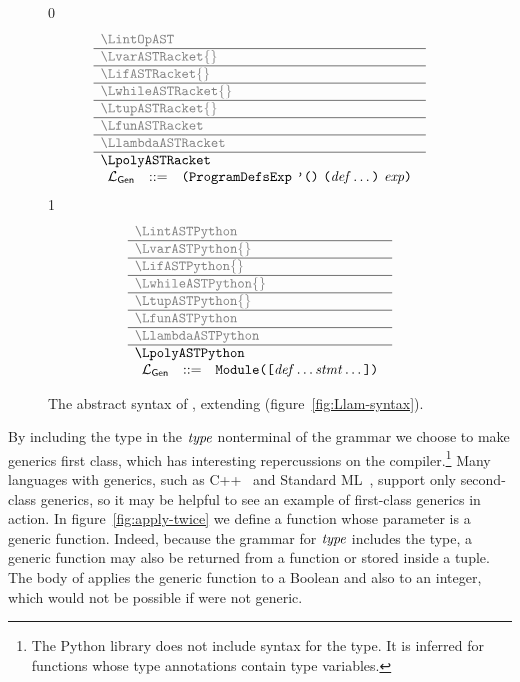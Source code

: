\documentclass[7x10]{TimesAPriori_MIT}%
\newcommand{\gray}[1]{{\color{gray} #1}}
\def\racketEd{0}
\def\pythonEd{1}
\def\edition{1}
\newcommand{\pythonColor}[0]{}
\numberwithin{theorem}{chapter}
\numberwithin{definition}{chapter}
\numberwithin{equation}{chapter}
\begin{document}
\begin{figure}[tp]
\centering
\begin{tcolorbox}[colback=white]
\footnotesize
{\if\edition\racketEd
\[
\begin{array}{l}
  \gray{\LintOpAST} \\ \hline
  \gray{\LvarASTRacket{}} \\ \hline
  \gray{\LifASTRacket{}} \\ \hline
  \gray{\LwhileASTRacket{}} \\ \hline
  \gray{\LtupASTRacket{}} \\ \hline
  \gray{\LfunASTRacket} \\ \hline
  \gray{\LlambdaASTRacket} \\ \hline
  \LpolyASTRacket \\
\begin{array}{lcl}
  \LangPoly{} &::=& \PROGRAMDEFSEXP{\code{'()}}{\LP\Def\ldots\RP}{\Exp}
\end{array}
\end{array}
\]
\fi}
{\if\edition\pythonEd\pythonColor
\[
\begin{array}{l}
  \gray{\LintASTPython} \\ \hline
  \gray{\LvarASTPython{}} \\ \hline
  \gray{\LifASTPython{}} \\ \hline
  \gray{\LwhileASTPython{}} \\ \hline
  \gray{\LtupASTPython{}} \\ \hline
  \gray{\LfunASTPython} \\ \hline
  \gray{\LlambdaASTPython} \\ \hline
  \LpolyASTPython \\
  \begin{array}{lcl}
  \LangPoly{} &::=& \PROGRAM{}{\LS \Def \ldots \Stmt \ldots \RS}
  \end{array}
\end{array}
\]
\fi}
\end{tcolorbox}

\caption{The abstract syntax of \LangPoly{}, extending \LangLam{}
    (figure~\ref{fig:Llam-syntax}).}
\label{fig:Lpoly-syntax}
\end{figure}

By including the  type in the $\mathit{type}$ nonterminal of the
grammar we choose to make generics first class, which has interesting
repercussions on the compiler.\footnote{The Python  library does
not include syntax for the  type. It is inferred for functions whose
type annotations contain type variables.}  Many languages with generics, such as
C++~\citep{stroustrup88:_param_types} and Standard
ML~\citep{Milner:1990fk}, support only second-class generics, so it
may be helpful to see an example of first-class generics in action. In
figure~\ref{fig:apply-twice} we define a function 
whose parameter is a generic function. Indeed, because the grammar for
$\mathit{type}$ includes the  type, a generic function may also be
returned from a function or stored inside a tuple. The body of
 applies the generic function  to a Boolean
and also to an integer, which would not be possible if  were
not generic.
\end{document}
